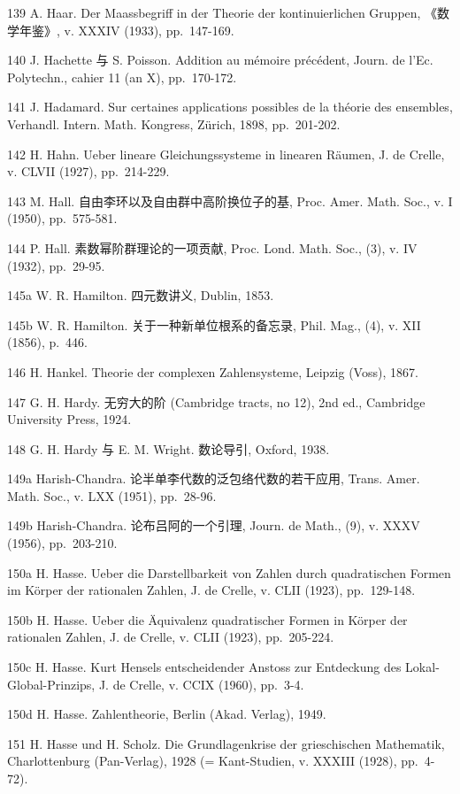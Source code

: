 139 A. Haar. Der Maassbegriff in der Theorie der kontinuierlichen Gruppen, 《数学年鉴》, v. XXXIV (1933), pp.~147-169.

140 J. Hachette 与 S. Poisson. Addition au mémoire précédent, Journ. de l'Ec. Polytechn., cahier 11 (an X), pp.~170-172.

141 J. Hadamard. Sur certaines applications possibles de la théorie des ensembles, Verhandl. Intern. Math. Kongress, Zürich, 1898, pp.~201-202.

142 H. Hahn. Ueber lineare Gleichungssysteme in linearen Räumen, J. de Crelle, v. CLVII (1927), pp.~214-229.

143 M. Hall. 自由李环以及自由群中高阶换位子的基, Proc. Amer. Math. Soc., v. I (1950), pp.~575-581.

144 P. Hall. 素数幂阶群理论的一项贡献, Proc. Lond. Math. Soc., (3), v. IV (1932), pp.~29-95.

145a W. R. Hamilton. 四元数讲义, Dublin, 1853.

145b W. R. Hamilton. 关于一种新单位根系的备忘录, Phil. Mag., (4), v. XII (1856), p.~446.

146 H. Hankel. Theorie der complexen Zahlensysteme, Leipzig (Voss), 1867.

147 G. H. Hardy. 无穷大的阶 (Cambridge tracts, no 12), 2nd ed., Cambridge University Press, 1924.

148 G. H. Hardy 与 E. M. Wright. 数论导引, Oxford, 1938.

149a Harish-Chandra. 论半单李代数的泛包络代数的若干应用, Trans. Amer. Math. Soc., v. LXX (1951), pp.~28-96.

149b Harish-Chandra. 论布吕阿的一个引理, Journ. de Math., (9), v. XXXV (1956), pp.~203-210.

150a H. Hasse. Ueber die Darstellbarkeit von Zahlen durch quadratischen Formen im Körper der rationalen Zahlen, J. de Crelle, v. CLII (1923), pp.~129-148.

150b H. Hasse. Ueber die Äquivalenz quadratischer Formen in Körper der rationalen Zahlen, J. de Crelle, v. CLII (1923), pp.~205-224.

150c H. Hasse. Kurt Hensels entscheidender Anstoss zur Entdeckung des Lokal-Global-Prinzips, J. de Crelle, v. CCIX (1960), pp.~3-4.

150d H. Hasse. Zahlentheorie, Berlin (Akad. Verlag), 1949.

151 H. Hasse und H. Scholz. Die Grundlagenkrise der grieschischen Mathematik, Charlottenburg (Pan-Verlag), 1928 (= Kant-Studien, v. XXXIII (1928), pp.~4-72).

